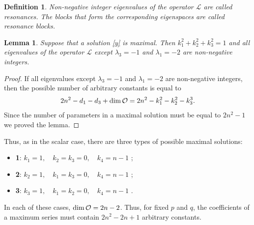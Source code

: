 \documentclass{article}
\theoremstyle{plain}
\newtheorem{lemma}[theorem]{Lemma}
\newtheorem*{definition}{Definition}
\begin{document}
\begin{definition}
Non-negative integer eigenvalues of the operator $\mathcal{L}$ are called {\it resonances}. 
The blocks that form the corresponding eigenspaces are called {\it resonance blocks}.
\end{definition}

\begin{lemma} \label{lem:max}
 Suppose that a solution \eqref{y} is maximal. Then  $k_1^2 + k_2^2 + k_3^2 = 1$ and all eigenvalues of the operator $\mathcal{L}$  except $\lambda_3 = - 1$ and $\lambda_1 = - 2$  are non-negative integers.
\end{lemma}

\begin{proof} If all eigenvalues except $\lambda_3 = - 1$ and $\lambda_1 = - 2$ are non-negative integers, then the possible number of arbitrary constants is equal to 
$$
2 n^2 - d_1 - d_3 + {\rm dim}\, {\mathcal O} = 2 n^2 - k_1^2-k_2^2-k_3^3.
$$
Since the number of parameters in a maximal solution must be equal to $2 n^2-1$ we proved the lemma.

\end{proof}
Thus, as in the scalar case, there are three types of possible maximal solutions:
\begin{itemize}
\item {\bf 1}: \qquad  $k_1=1, \quad k_2=k_3=0,\quad k_4=n-1$ ;
\item {\bf 2}: \qquad  $k_2=1, \quad k_1=k_3=0,\quad k_4=n-1$ ;
\item {\bf 3}: \qquad  $k_3=1, \quad k_1=k_2=0,\quad k_4=n-1$ .
\end{itemize}
In each of these cases, ${\rm dim}\,{\mathcal O} = 2 n -2$. Thus, for fixed $p$ and $q$, the coefficients of a maximum series must contain $2 n^2 - 2 n +1$ arbitrary constants.
\end{document}
